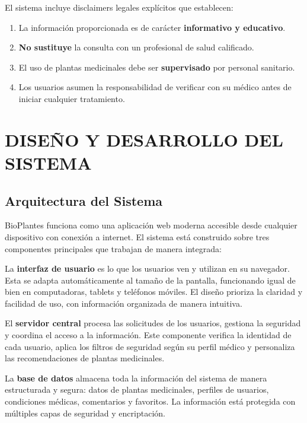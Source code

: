 \documentclass[12pt,a4paper]{article}
\begin{document}
El sistema incluye disclaimers legales explícitos que establecen:

\begin{enumerate}
    \item La información proporcionada es de carácter \textbf{informativo y educativo}.
    \item \textbf{No sustituye} la consulta con un profesional de salud calificado.
    \item El uso de plantas medicinales debe ser \textbf{supervisado} por personal sanitario.
    \item Los usuarios asumen la responsabilidad de verificar con su médico antes de iniciar cualquier tratamiento.
\end{enumerate}


\section{DISEÑO Y DESARROLLO DEL SISTEMA}

\subsection{Arquitectura del Sistema}

BioPlantes funciona como una aplicación web moderna accesible desde cualquier dispositivo con conexión a internet. El sistema está construido sobre tres componentes principales que trabajan de manera integrada:

La \textbf{interfaz de usuario} es lo que los usuarios ven y utilizan en su navegador. Esta se adapta automáticamente al tamaño de la pantalla, funcionando igual de bien en computadoras, tablets y teléfonos móviles. El diseño prioriza la claridad y facilidad de uso, con información organizada de manera intuitiva.

El \textbf{servidor central} procesa las solicitudes de los usuarios, gestiona la seguridad y coordina el acceso a la información. Este componente verifica la identidad de cada usuario, aplica los filtros de seguridad según su perfil médico y personaliza las recomendaciones de plantas medicinales.

La \textbf{base de datos} almacena toda la información del sistema de manera estructurada y segura: datos de plantas medicinales, perfiles de usuarios, condiciones médicas, comentarios y favoritos. La información está protegida con múltiples capas de seguridad y encriptación.
\end{document}
